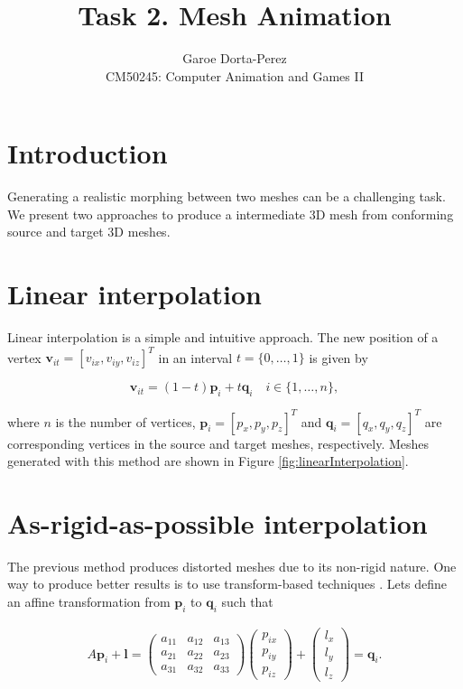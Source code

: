 \documentclass[12pt]{article}
\begin{document}
  
\title{Task 2. Mesh Animation}
\author{Garoe Dorta-Perez\\
CM50245: Computer Animation and Games II}
 
\maketitle
 
\section{Introduction}

Generating a realistic morphing between two meshes can be a challenging task.
We present two approaches to produce a intermediate 3D mesh from conforming source and target 3D meshes. 

\section{Linear interpolation}

Linear interpolation is a simple and intuitive approach.
The new position of a vertex $\mathbf{v}_{it} = \left[ v_{ix}, v_{iy}, v_{iz}\right]^T $ in an interval $t = \lbrace 0, \ldots, 1 \rbrace$ is given by

\begin{equation*}
\mathbf{v}_{it} = (1 - t) \mathbf{p}_i + t \mathbf{q}_i \quad i \in \lbrace 1, \ldots, n \rbrace,
\end{equation*}

where $n$ is the number of vertices, $\mathbf{p}_i = \left[ p_x, p_y, p_z\right]^T$ and $\mathbf{q}_i = \left[ q_x, q_y, q_z\right]^T$ are corresponding vertices in the source and target meshes, respectively.
Meshes generated with this method are shown in Figure \ref{fig:linearInterpolation}.

\section{As-rigid-as-possible interpolation}

The previous method produces distorted meshes due to its non-rigid nature.
One way to produce better results is to use transform-based techniques \cite{Alexa2000}.
Lets define an affine transformation from $\mathbf{p}_i$ to $\mathbf{q}_i$ such that

\begin{align*}
A \mathbf{p}_i + \mathbf{l} = \begin{pmatrix}
 a_{11} & a_{12} & a_{13} \\ 
 a_{21} & a_{22} & a_{23} \\ 
 a_{31} & a_{32}  & a_{33} 
\end{pmatrix} 
\begin{pmatrix}
 p_{ix} \\ 
 p_{iy} \\ 
 p_{iz} 
\end{pmatrix} +
\begin{pmatrix}
 l_x \\ 
 l_y \\ 
 l_z
\end{pmatrix} = \mathbf{q}_i.
\end{align*}
\end{document}
